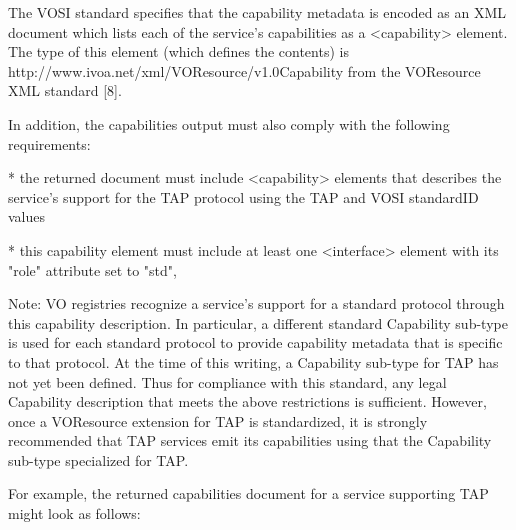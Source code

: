 \documentclass[11pt,letter]{ivoa}
\begin{document}
The VOSI standard specifies that the capability metadata is encoded as an XML 
document which lists each of the service's capabilities as a <capability> 
element. The type of this element (which defines the contents) is 
{http://www.ivoa.net/xml/VOResource/v1.0}Capability from the VOResource XML 
standard [8].

In addition, the capabilities output must also comply with the following    
requirements:

* the returned document must include <capability> elements 
that describes the service's support for the TAP protocol using the TAP and 
VOSI standardID values

* this capability element must include at least one <interface> element 
with its "role" attribute set to "std",  

Note: VO registries recognize a service's support for a standard protocol 
through this capability description. In particular, a different standard 
Capability sub-type is used for each standard protocol to provide capability 
metadata that is specific to that protocol. At the time of this writing, a 
Capability sub-type for TAP has not yet been defined. Thus for compliance with 
this standard, any legal Capability description that meets the above 
restrictions is sufficient. However, once a VOResource extension for TAP is 
standardized, it is strongly recommended that TAP services emit its 
capabilities using that the Capability sub-type specialized for TAP.

For example, the returned capabilities document for a service supporting  TAP 
might look as follows:
\end{document}
